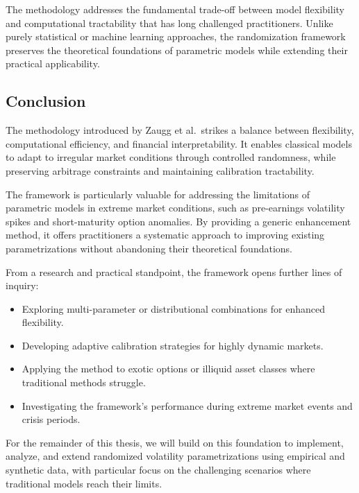 The methodology addresses the fundamental trade-off between model flexibility and computational tractability that has long challenged practitioners. Unlike purely statistical or machine learning approaches, the randomization framework preserves the theoretical foundations of parametric models while extending their practical applicability.

\subsection{Conclusion}

The methodology introduced by Zaugg et al.\ strikes a balance between flexibility, computational efficiency, and financial interpretability. It enables classical models to adapt to irregular market conditions through controlled randomness, while preserving arbitrage constraints and maintaining calibration tractability.

The framework is particularly valuable for addressing the limitations of parametric models in extreme market conditions, such as pre-earnings volatility spikes and short-maturity option anomalies. By providing a generic enhancement method, it offers practitioners a systematic approach to improving existing parametrizations without abandoning their theoretical foundations.

From a research and practical standpoint, the framework opens further lines of inquiry:
\begin{itemize}
    \item Exploring multi-parameter or distributional combinations for enhanced flexibility.
    \item Developing adaptive calibration strategies for highly dynamic markets.
    \item Applying the method to exotic options or illiquid asset classes where traditional methods struggle.
    \item Investigating the framework's performance during extreme market events and crisis periods.
\end{itemize}

For the remainder of this thesis, we will build on this foundation to implement, analyze, and extend randomized volatility parametrizations using empirical and synthetic data, with particular focus on the challenging scenarios where traditional models reach their limits.
